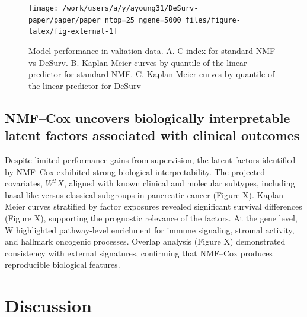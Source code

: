 \documentclass[9pt,twocolumn,twoside,]{pnas-new}
\begin{document}
\begin{figure}[t]

{\centering \texttt{[image: /work/users/a/y/ayoung31/DeSurv-paper/paper/paper\_ntop=25\_ngene=5000\_files/figure-latex/fig-external-1]} 

}

\caption{Model performance in valiation data. A. C-index for standard NMF vs DeSurv. B. Kaplan Meier curves by quantile of the linear predictor for standard NMF. C. Kaplan Meier curves by quantile of the linear predictor for DeSurv}\label{fig:fig-external}
\end{figure}

\subsection{NMF--Cox uncovers biologically interpretable latent factors
associated with clinical
outcomes}\label{nmfcox-uncovers-biologically-interpretable-latent-factors-associated-with-clinical-outcomes}

Despite limited performance gains from supervision, the latent factors
identified by NMF--Cox exhibited strong biological interpretability. The
projected covariates, \(W^TX\), aligned with known clinical and
molecular subtypes, including basal-like versus classical subgroups in
pancreatic cancer (Figure X). Kaplan--Meier curves stratified by factor
exposures revealed significant survival differences (Figure X),
supporting the prognostic relevance of the factors. At the gene level, W
highlighted pathway-level enrichment for immune signaling, stromal
activity, and hallmark oncogenic processes. Overlap analysis (Figure X)
demonstrated consistency with external signatures, confirming that
NMF--Cox produces reproducible biological features.

\section*{Discussion}\label{discussion}

\showmatmethods
\showacknow
\pnasbreak



% 
\end{document}
